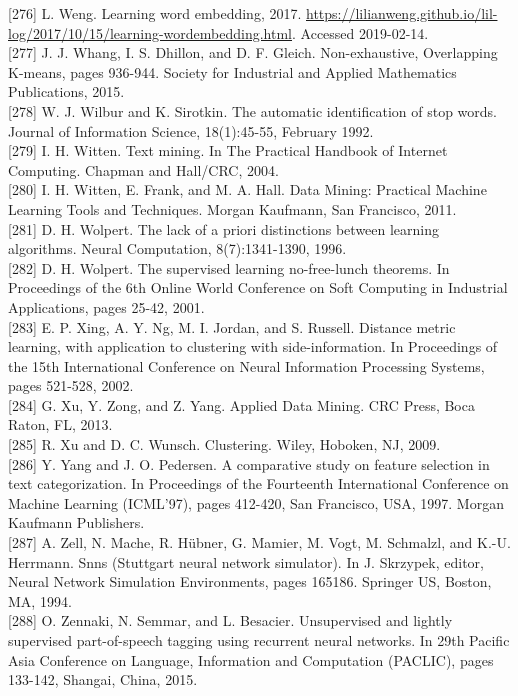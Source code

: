 \documentclass[10pt]{book}
\begin{document}
[276] L. Weng. Learning word embedding, 2017. \href{https://lilianweng.github.io/lil-log/2017/10/15/learning-wordembedding.html}{https://lilianweng.github.io/lil-log/2017/10/15/learning-wordembedding.html}. Accessed 2019-02-14.\\[0pt]
[277] J. J. Whang, I. S. Dhillon, and D. F. Gleich. Non-exhaustive, Overlapping K-means, pages 936-944. Society for Industrial and Applied Mathematics Publications, 2015.\\[0pt]
[278] W. J. Wilbur and K. Sirotkin. The automatic identification of stop words. Journal of Information Science, 18(1):45-55, February 1992.\\[0pt]
[279] I. H. Witten. Text mining. In The Practical Handbook of Internet Computing. Chapman and Hall/CRC, 2004.\\[0pt]
[280] I. H. Witten, E. Frank, and M. A. Hall. Data Mining: Practical Machine Learning Tools and Techniques. Morgan Kaufmann, San Francisco, 2011.\\[0pt]
[281] D. H. Wolpert. The lack of a priori distinctions between learning algorithms. Neural Computation, 8(7):1341-1390, 1996.\\[0pt]
[282] D. H. Wolpert. The supervised learning no-free-lunch theorems. In Proceedings of the 6th Online World Conference on Soft Computing in Industrial Applications, pages 25-42, 2001.\\[0pt]
[283] E. P. Xing, A. Y. Ng, M. I. Jordan, and S. Russell. Distance metric learning, with application to clustering with side-information. In Proceedings of the 15th International Conference on Neural Information Processing Systems, pages 521-528, 2002.\\[0pt]
[284] G. Xu, Y. Zong, and Z. Yang. Applied Data Mining. CRC Press, Boca Raton, FL, 2013.\\[0pt]
[285] R. Xu and D. C. Wunsch. Clustering. Wiley, Hoboken, NJ, 2009.\\[0pt]
[286] Y. Yang and J. O. Pedersen. A comparative study on feature selection in text categorization. In Proceedings of the Fourteenth International Conference on Machine Learning (ICML'97), pages 412-420, San Francisco, USA, 1997. Morgan Kaufmann Publishers.\\[0pt]
[287] A. Zell, N. Mache, R. Hübner, G. Mamier, M. Vogt, M. Schmalzl, and K.-U. Herrmann. Snns (Stuttgart neural network simulator). In J. Skrzypek, editor, Neural Network Simulation Environments, pages 165186. Springer US, Boston, MA, 1994.\\[0pt]
[288] O. Zennaki, N. Semmar, and L. Besacier. Unsupervised and lightly supervised part-of-speech tagging using recurrent neural networks. In 29th Pacific Asia Conference on Language, Information and Computation (PACLIC), pages 133-142, Shangai, China, 2015.\\[0pt]
\end{document}
